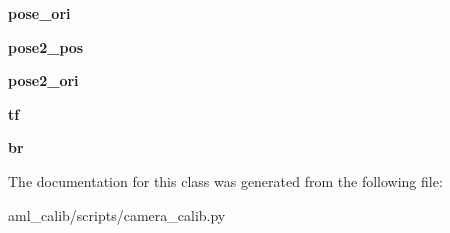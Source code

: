 \begin{DoxyCompactItemize}
{\bfseries pose\+\_\+ori}
\item 
\hypertarget{classcamera__calib_1_1_baxter___eye___hand___calib_ae7be52d3c7dcec84c72263ba478d9836}{}\label{classcamera__calib_1_1_baxter___eye___hand___calib_ae7be52d3c7dcec84c72263ba478d9836} 
{\bfseries pose2\+\_\+pos}
\item 
\hypertarget{classcamera__calib_1_1_baxter___eye___hand___calib_ab4c5e265b75dbc426e02d079ef8f1030}{}\label{classcamera__calib_1_1_baxter___eye___hand___calib_ab4c5e265b75dbc426e02d079ef8f1030} 
{\bfseries pose2\+\_\+ori}
\item 
\hypertarget{classcamera__calib_1_1_baxter___eye___hand___calib_a43206bf881a79c98ddd86917efbf2239}{}\label{classcamera__calib_1_1_baxter___eye___hand___calib_a43206bf881a79c98ddd86917efbf2239} 
{\bfseries tf}
\item 
\hypertarget{classcamera__calib_1_1_baxter___eye___hand___calib_a55dcc04199f3a490cccf70ef66d467a0}{}\label{classcamera__calib_1_1_baxter___eye___hand___calib_a55dcc04199f3a490cccf70ef66d467a0} 
{\bfseries br}
\end{DoxyCompactItemize}


The documentation for this class was generated from the following file\+:\begin{DoxyCompactItemize}
\item 
aml\+\_\+calib/scripts/camera\+\_\+calib.\+py\end{DoxyCompactItemize}
